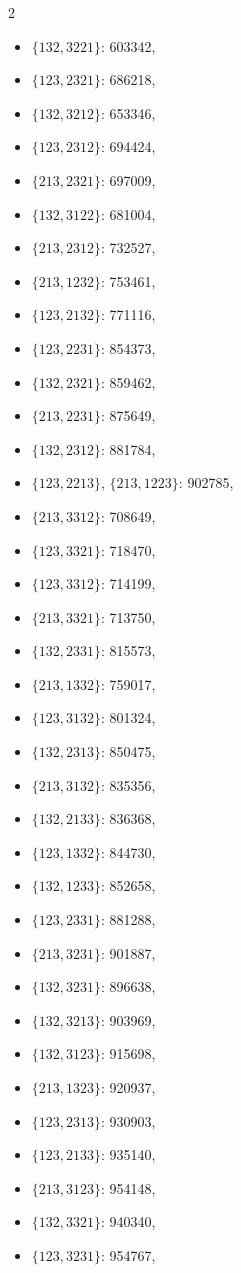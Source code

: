 \documentclass[11pt]{amsart}
\theoremstyle{plain}
\theoremstyle{definition}
\begin{document}
{\begin{multicols}{2}
\begin{itemize}
\item $\{132,3221\}$: 603342,
\item $\{123,2321\}$: 686218,
\item $\{132,3212\}$: 653346,
\item $\{123,2312\}$: 694424,
\item $\{213,2321\}$: 697009,
\item $\{132,3122\}$: 681004,
\item $\{213,2312\}$: 732527,
\item $\{213,1232\}$: 753461,
\item $\{123,2132\}$: 771116,
\item $\{123,2231\}$: 854373,
\item $\{132,2321\}$: 859462,
\item $\{213,2231\}$: 875649,
\item $\{132,2312\}$: 881784,
\item[$\blacksquare$] {$\{123,2213\}$, $\{213,1223\}$}: 902785,
\item $\{213,3312\}$: 708649,
\item $\{123,3321\}$: 718470,
\item $\{123,3312\}$: 714199,
\item $\{213,3321\}$: 713750,
\item $\{132,2331\}$: 815573,
\item $\{213,1332\}$: 759017,
\item $\{123,3132\}$: 801324,
\item $\{132,2313\}$: 850475,
\item $\{213,3132\}$: 835356,
\item $\{132,2133\}$: 836368,
\item $\{123,1332\}$: 844730,
\item $\{132,1233\}$: 852658,
\item $\{123,2331\}$: 881288,
\item $\{213,3231\}$: 901887,
\item $\{132,3231\}$: 896638,
\item $\{132,3213\}$: 903969,
\item $\{132,3123\}$: 915698,
\item $\{213,1323\}$: 920937,
\item $\{123,2313\}$: 930903,
\item $\{123,2133\}$: 935140,
\item $\{213,3123\}$: 954148,
\item $\{132,3321\}$: 940340,
\item $\{123,3231\}$: 954767,

\end{itemize}
\end{multicols}}
\end{document}
